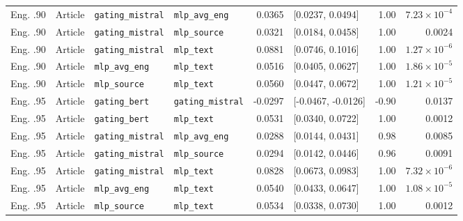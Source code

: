 \documentclass[10pt,letterpaper]{article}
\begin{document}
\begin{longtable}{llllrlrr}
Eng. .90 & Article & \texttt{gating\_mistral} & \texttt{mlp\_avg\_eng} & 0.0365 & [0.0237, 0.0494] & 1.00 & $7.23\times10^{-4}$ \\
Eng. .90 & Article & \texttt{gating\_mistral} & \texttt{mlp\_source} & 0.0321 & [0.0184, 0.0458] & 1.00 & 0.0024 \\
Eng. .90 & Article & \texttt{gating\_mistral} & \texttt{mlp\_text} & 0.0881 & [0.0746, 0.1016] & 1.00 & $1.27\times10^{-6}$ \\
Eng. .90 & Article & \texttt{mlp\_avg\_eng} & \texttt{mlp\_text} & 0.0516 & [0.0405, 0.0627] & 1.00 & $1.86\times10^{-5}$ \\
Eng. .90 & Article & \texttt{mlp\_source} & \texttt{mlp\_text} & 0.0560 & [0.0447, 0.0672] & 1.00 & $1.21\times10^{-5}$ \\
Eng. .95 & Article & \texttt{gating\_bert} & \texttt{gating\_mistral} & -0.0297 & [-0.0467, -0.0126] & -0.90 & 0.0137 \\
Eng. .95 & Article & \texttt{gating\_bert} & \texttt{mlp\_text} & 0.0531 & [0.0340, 0.0722] & 1.00 & 0.0012 \\
Eng. .95 & Article & \texttt{gating\_mistral} & \texttt{mlp\_avg\_eng} & 0.0288 & [0.0144, 0.0431] & 0.98 & 0.0085 \\
Eng. .95 & Article & \texttt{gating\_mistral} & \texttt{mlp\_source} & 0.0294 & [0.0142, 0.0446] & 0.96 & 0.0091 \\
Eng. .95 & Article & \texttt{gating\_mistral} & \texttt{mlp\_text} & 0.0828 & [0.0673, 0.0983] & 1.00 & $7.32\times10^{-6}$ \\
Eng. .95 & Article & \texttt{mlp\_avg\_eng} & \texttt{mlp\_text} & 0.0540 & [0.0433, 0.0647] & 1.00 & $1.08\times10^{-5}$ \\
Eng. .95 & Article & \texttt{mlp\_source} & \texttt{mlp\_text} & 0.0534 & [0.0338, 0.0730] & 1.00 & 0.0012 \\
\end{longtable}
\end{document}
